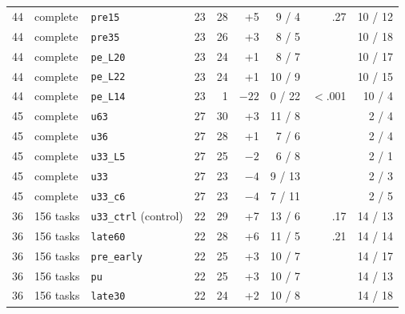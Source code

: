 \begin{table}[h]
{\begin{tabular}{lllrrrrrr}
\midrule
44 & complete & \texttt{pre15} & 23 & 28 & +5 & 9 / 4 & .27 & 10 / 12 \\
44 & complete & \texttt{pre35} & 23 & 26 & +3 & 8 / 5 &  & 10 / 18 \\
44 & complete & \texttt{pe\_L20} & 23 & 24 & +1 & 8 / 7 &  & 10 / 17 \\
44 & complete & \texttt{pe\_L22} & 23 & 24 & +1 & 10 / 9 &  & 10 / 15 \\
44 & complete & \texttt{pe\_L14} & 23 & 1 & $-22$ & 0 / 22 & $<$.001 & 10 / 4 \\
\midrule
45 & complete & \texttt{u63} & 27 & 30 & +3 & 11 / 8 &  & 2 / 4 \\
45 & complete & \texttt{u36} & 27 & 28 & +1 & 7 / 6 &  & 2 / 4 \\
45 & complete & \texttt{u33\_L5} & 27 & 25 & $-2$ & 6 / 8 &  & 2 / 1 \\
45 & complete & \texttt{u33} & 27 & 23 & $-4$ & 9 / 13 &  & 2 / 3 \\
45 & complete & \texttt{u33\_c6} & 27 & 23 & $-4$ & 7 / 11 &  & 2 / 5 \\
\midrule
36 & 156 tasks & \texttt{u33\_ctrl} (control) & 22 & 29 & +7 & 13 / 6 & .17 & 14 / 13 \\
36 & 156 tasks & \texttt{late60} & 22 & 28 & +6 & 11 / 5 & .21 & 14 / 14 \\
36 & 156 tasks & \texttt{pre\_early} & 22 & 25 & +3 & 10 / 7 &  & 14 / 17 \\
36 & 156 tasks & \texttt{pu} & 22 & 25 & +3 & 10 / 7 &  & 14 / 13 \\
36 & 156 tasks & \texttt{late30} & 22 & 24 & +2 & 10 / 8 &  & 14 / 18 \\
\bottomrule
\end{tabular}}
\end{table}


